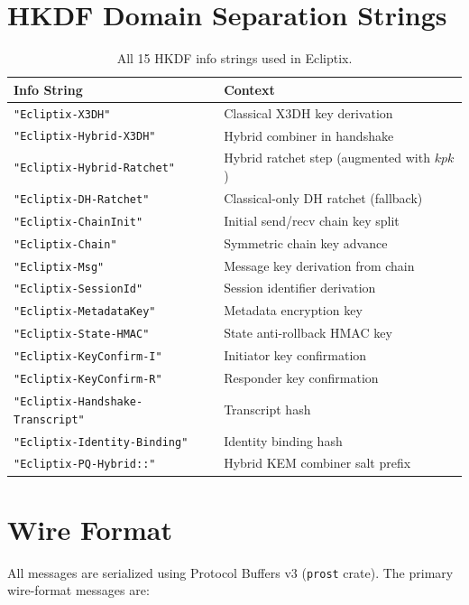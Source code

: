 \documentclass[11pt,a4paper]{article}
\theoremstyle{definition}
\begin{document}
\section{HKDF Domain Separation Strings}\label{app:info-strings}

\begin{table}[H]
\centering
\caption{All 15 HKDF info strings used in Ecliptix.}\label{tab:info-strings}
\small
\begin{tabular}{@{}ll@{}}
\toprule
Info String & Context \\
\midrule
\texttt{"Ecliptix-X3DH"} & Classical X3DH key derivation \\
\texttt{"Ecliptix-Hybrid-X3DH"} & Hybrid combiner in handshake \\
\texttt{"Ecliptix-Hybrid-Ratchet"} & Hybrid ratchet step (augmented with $kpk$) \\
\texttt{"Ecliptix-DH-Ratchet"} & Classical-only DH ratchet (fallback) \\
\texttt{"Ecliptix-ChainInit"} & Initial send/recv chain key split \\
\texttt{"Ecliptix-Chain"} & Symmetric chain key advance \\
\texttt{"Ecliptix-Msg"} & Message key derivation from chain \\
\texttt{"Ecliptix-SessionId"} & Session identifier derivation \\
\texttt{"Ecliptix-MetadataKey"} & Metadata encryption key \\
\texttt{"Ecliptix-State-HMAC"} & State anti-rollback HMAC key \\
\texttt{"Ecliptix-KeyConfirm-I"} & Initiator key confirmation \\
\texttt{"Ecliptix-KeyConfirm-R"} & Responder key confirmation \\
\texttt{"Ecliptix-Handshake-Transcript"} & Transcript hash \\
\texttt{"Ecliptix-Identity-Binding"} & Identity binding hash \\
\texttt{"Ecliptix-PQ-Hybrid::"} & Hybrid KEM combiner salt prefix \\
\bottomrule
\end{tabular}
\end{table}

\section{Wire Format}\label{app:wire-format}

All messages are serialized using Protocol Buffers v3 (\texttt{prost} crate). The primary wire-format messages are:
\end{document}
